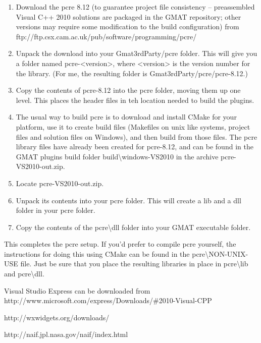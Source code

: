 \documentclass[letterpaper,10pt]{article}%
\begin{document}
\begin{enumerate}
\item Download the pcre 8.12 (to guarantee project file consistency -- preassembled Visual C++ 2010 solutions are packaged in the GMAT repository; other versions may require some modification to the build configuration) from ftp://ftp.csx.cam.ac.uk/pub/software/programming/pcre/
\item Unpack the download into your Gmat3rdParty/pcre folder.  This will give you a folder named pcre-<version>, where <version> is the version number for the library.  (For me, the resulting folder is Gmat3rdParty/pcre/pcre-8.12.)
\item Copy the contents of pcre-8.12 into the pcre folder, moving them up one level.  This places the header files in teh location needed to build the plugins.
\item The usual way to build pcre is to download and install CMake for your platform, use it to create build files (Makefiles on unix like systems, project files and solution files on Windows), and then build from those files. The pcre library files have already been created for pcre-8.12, and can be found in the GMAT plugins build folder build\textbackslash windows-VS2010 in the archive pcre-VS2010-out.zip.
\item Locate pcre-VS2010-out.zip.
\item Unpack its contents into your pcre folder.  This will create a lib and a dll folder in your pcre folder.
\item Copy the contents of the pcre\textbackslash dll folder into your GMAT executable folder.
\end{enumerate}

This completes the pcre setup.  If you'd prefer to compile pcre yourself, the instructions for doing this using CMake can be found in the pcre\textbackslash NON-UNIX-USE file.  Just be sure that you place the resulting libraries in place in pcre\textbackslash lib and pcre\textbackslash dll.

\begin{thebibliography}{9}                                                                                               
 Visual Studio Express can be downloaded from http://www.microsoft.com/express/Downloads/\#2010-Visual-CPP

 http://wxwidgets.org/downloads/

 http://naif.jpl.nasa.gov/naif/index.html

\end{thebibliography}
\end{document}
